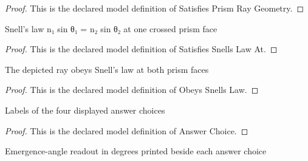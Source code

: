 \begin{proof}
  This is the declared model definition of Satisfies Prism Ray Geometry.
\end{proof}
\begin{definition}
  \label{def:physics:phyx-mini-0146:phyxminiproblems-problemphyxmini0146-satisfiessnellslawat}
  Snell's law n₁ sin θ₁ = n₂ sin θ₂ at one crossed prism face
\end{definition}
\begin{proof}
  This is the declared model definition of Satisfies Snells Law At.
\end{proof}
\begin{definition}
  \label{def:physics:phyx-mini-0146:phyxminiproblems-problemphyxmini0146-obeyssnellslaw}
  The depicted ray obeys Snell's law at both prism faces
\end{definition}
\begin{proof}
  This is the declared model definition of Obeys Snells Law.
\end{proof}
\begin{definition}
  \label{def:physics:phyx-mini-0146:phyxminiproblems-problemphyxmini0146-answerchoice}
  Labels of the four displayed answer choices
\end{definition}
\begin{proof}
  This is the declared model definition of Answer Choice.
\end{proof}
\begin{definition}
  \label{def:physics:phyx-mini-0146:phyxminiproblems-problemphyxmini0146-answerchoice-angledegrees}
  Emergence-angle readout in degrees printed beside each answer choice
\end{definition}
